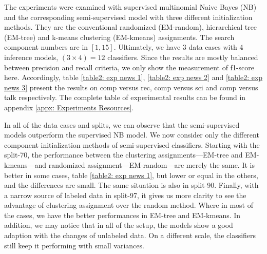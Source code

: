 The experiments were examined with supervised multinomial Naive Bayes (NB) and the corresponding semi-supervised model with three different initialization methods. They are the conventional randomized (EM-random), hierarchical tree (EM-tree) and k-means clustering (EM-kmeans) assignments. The search component numbers are in $[1, 15]$. Ultimately, we have 3 data cases with 4 inference models, $(3 \times 4) = 12$ classifiers. Since the results are mostly balanced between precision and recall criteria, we only show the measurement of f1-score here. Accordingly, table \ref{table2: exp news 1}, \ref{table2: exp news 2} and \ref{table2: exp news 3} present the results on comp versus rec, comp versus sci and comp versus talk respectively. The complete table of experimental results can be found in appendix \ref{appx: Experiments Resources}.

In all of the data cases and splits, we can observe that the semi-supervised models outperform the supervised NB model. We now consider only the different component initialization methods of semi-supervised classifiers. Starting with the split-70, the performance between the clustering assignments---EM-tree and EM-kmeans---and randomized assignment---EM-random---are merely the same. It is better in some cases, table \ref{table2: exp news 1}, but lower or equal in the others, and the differences are small. The same situation is also in split-90. Finally, with a narrow source of labeled data in split-97, it gives us more clarity to see the advantage of clustering assignment over the random method. Where in most of the cases, we have the better performances in EM-tree and EM-kmeans. In addition, we may notice that in all of the setup, the models show a good adaption with the changes of unlabeled data. On a different scale, the classifiers still keep it performing with small variances.

\pagebreak





